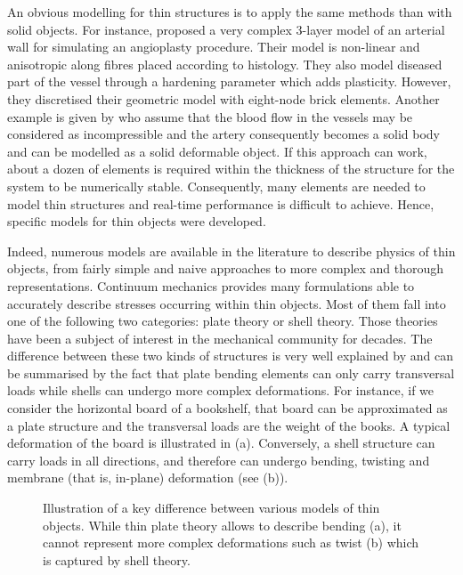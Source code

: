 An obvious modelling for thin structures is to apply the same methods than with solid objects. For instance, \cite{Holzapfel02} proposed a very complex 3-layer model of an arterial wall for simulating an angioplasty procedure. Their model is non-linear and anisotropic along fibres placed according to histology. They also model diseased part of the vessel through a hardening parameter which adds plasticity. However, they discretised their geometric model with eight-node brick elements. Another example is given by \cite{Aloisio04} who assume that the blood flow in the vessels may be considered as incompressible and the artery consequently becomes a solid body and can be modelled as a solid deformable object. If this approach can work, about a dozen of elements is required within the thickness of the structure for the system to be numerically stable. Consequently, many elements are needed to model thin structures and real-time performance is difficult to achieve. Hence, specific models for thin objects were developed. 

Indeed, numerous models are available in the literature to describe physics of thin objects, from fairly simple and naive approaches to more complex and thorough representations. Continuum mechanics provides many formulations able to accurately describe stresses occurring within thin objects. Most of them fall into one of the following two categories: plate theory or shell theory. Those theories have been a subject of interest in the mechanical community for decades. The difference between these two kinds of structures is very well explained by \cite{Liu03} and can be summarised by the fact that plate bending elements can only carry transversal loads while shells can undergo more complex deformations. 
For instance, if we consider the horizontal board of a bookshelf, that board can be approximated as a plate structure and the transversal loads are the weight of the books. A typical deformation of the board is illustrated in  (a). Conversely, a shell structure can carry loads in all directions, and therefore can undergo bending, twisting and membrane (that is, in-plane) deformation (see  (b)). 
%
\begin{figure}[ht]
\centering 
{}
\hfill 
{}
\caption[Illustration of the key difference between plate and shell theory]{Illustration of a key difference between various models of thin objects. While thin plate theory allows to describe bending (a), it cannot represent more complex deformations such as twist (b) which is captured by shell theory.}
\label{chap7:fig-boards}
\end{figure}


